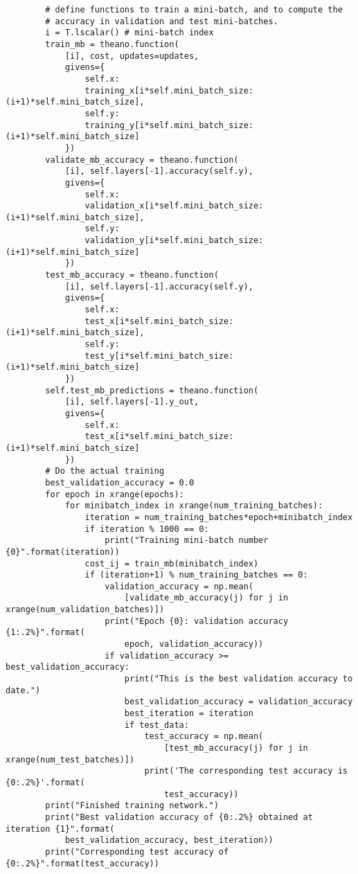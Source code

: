 \begin{lstlisting}
        # define functions to train a mini-batch, and to compute the
        # accuracy in validation and test mini-batches.
        i = T.lscalar() # mini-batch index
        train_mb = theano.function(
            [i], cost, updates=updates,
            givens={
                self.x:
                training_x[i*self.mini_batch_size: (i+1)*self.mini_batch_size],
                self.y:
                training_y[i*self.mini_batch_size: (i+1)*self.mini_batch_size]
            })
        validate_mb_accuracy = theano.function(
            [i], self.layers[-1].accuracy(self.y),
            givens={
                self.x:
                validation_x[i*self.mini_batch_size: (i+1)*self.mini_batch_size],
                self.y:
                validation_y[i*self.mini_batch_size: (i+1)*self.mini_batch_size]
            })
        test_mb_accuracy = theano.function(
            [i], self.layers[-1].accuracy(self.y),
            givens={
                self.x:
                test_x[i*self.mini_batch_size: (i+1)*self.mini_batch_size],
                self.y:
                test_y[i*self.mini_batch_size: (i+1)*self.mini_batch_size]
            })
        self.test_mb_predictions = theano.function(
            [i], self.layers[-1].y_out,
            givens={
                self.x:
                test_x[i*self.mini_batch_size: (i+1)*self.mini_batch_size]
            })
        # Do the actual training
        best_validation_accuracy = 0.0
        for epoch in xrange(epochs):
            for minibatch_index in xrange(num_training_batches):
                iteration = num_training_batches*epoch+minibatch_index
                if iteration % 1000 == 0:
                    print("Training mini-batch number {0}".format(iteration))
                cost_ij = train_mb(minibatch_index)
                if (iteration+1) % num_training_batches == 0:
                    validation_accuracy = np.mean(
                        [validate_mb_accuracy(j) for j in xrange(num_validation_batches)])
                    print("Epoch {0}: validation accuracy {1:.2%}".format(
                        epoch, validation_accuracy))
                    if validation_accuracy >= best_validation_accuracy:
                        print("This is the best validation accuracy to date.")
                        best_validation_accuracy = validation_accuracy
                        best_iteration = iteration
                        if test_data:
                            test_accuracy = np.mean(
                                [test_mb_accuracy(j) for j in xrange(num_test_batches)])
                            print('The corresponding test accuracy is {0:.2%}'.format(
                                test_accuracy))
        print("Finished training network.")
        print("Best validation accuracy of {0:.2%} obtained at iteration {1}".format(
            best_validation_accuracy, best_iteration))
        print("Corresponding test accuracy of {0:.2%}".format(test_accuracy))


\end{lstlisting}
